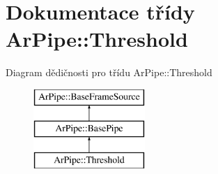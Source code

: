 \hypertarget{class_ar_pipe_1_1_threshold}{\section{Dokumentace třídy Ar\-Pipe\-:\-:Threshold}
\label{d8/df3/class_ar_pipe_1_1_threshold}
}
Diagram dědičnosti pro třídu Ar\-Pipe\-:\-:Threshold\begin{figure}[H]
\begin{center}
\leavevmode
\includegraphics[height=3.000000cm]{d8/df3/class_ar_pipe_1_1_threshold}
\end{center}
\end{figure}
